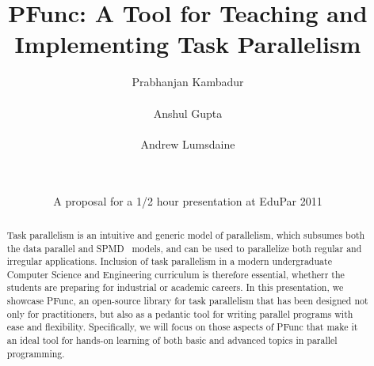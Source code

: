 \documentclass[9pt,twocolumn,letter]{article}
\begin{document}
\title{PFunc: A Tool for Teaching and Implementing Task Parallelism}

\date{A proposal for a 1/2 hour presentation at EduPar 2011}

\author{
  \alignauthor Prabhanjan Kambadur\\
  \\
  \alignauthor Anshul Gupta\\
  \\
  \alignauthor Andrew Lumsdaine\\
  \\
  \\
}

\maketitle


\begin{abstract} 
Task parallelism is an intuitive and generic model of parallelism, which
subsumes both the data parallel and SPMD~\cite{darema2001} models, and can be
used to parallelize both regular and irregular applications.
%
Inclusion of task parallelism in a modern undergraduate 
Computer Science and Engineering curriculum is therefore
essential, whetherr
the students are preparing for industrial or academic careers.
%
In this presentation, we showcase PFunc, an open-source library for
task parallelism that has been designed not only for practitioners, 
but also as
a pedantic tool for writing parallel programs with ease and flexibility.
%
Specifically, we will focus on those aspects of PFunc that make it an ideal 
tool for hands-on
learning of both basic and advanced topics in parallel programming.
\end{abstract}
\end{document}
